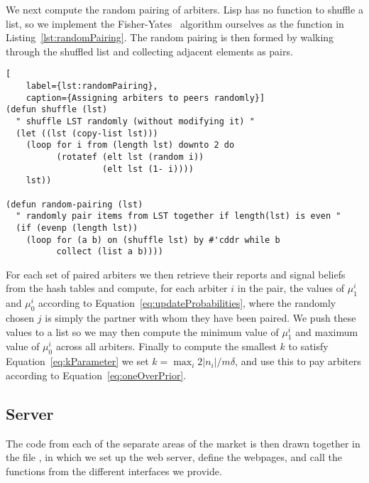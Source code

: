 We next compute the random pairing of arbiters. Lisp has no function to shuffle
a list, so we implement the Fisher-Yates~\cite[pg.~26-27]{FisherYates1938}
algorithm ourselves as the  function in
Listing~\ref{lst:randomPairing}. The random pairing is then formed by walking
through the shuffled list and collecting adjacent elements as pairs.

\begin{lstlisting}[
	label={lst:randomPairing},
	caption={Assigning arbiters to peers randomly}]
(defun shuffle (lst)
  " shuffle LST randomly (without modifying it) "
  (let ((lst (copy-list lst)))
    (loop for i from (length lst) downto 2 do
          (rotatef (elt lst (random i))
                   (elt lst (1- i))))
    lst))

(defun random-pairing (lst)
  " randomly pair items from LST together if length(lst) is even "
  (if (evenp (length lst))
    (loop for (a b) on (shuffle lst) by #'cddr while b
          collect (list a b))))
\end{lstlisting}

For each set of paired arbiters we then retrieve their reports and signal
beliefs from the hash tables and compute, for each arbiter $i$ in the pair, the
values of $\mu_1^i$ and $\mu_0^i$ according to
Equation~\ref{eq:updateProbabilities}, where the randomly chosen $j$ is simply
the partner with whom they have been paired. We push these values to a list so
we may then compute the minimum value of $\mu_1^i$ and maximum value of
$\mu_0^i$ across all arbiters. Finally to compute the smallest $k$ to satisfy
Equation~\ref{eq:kParameter} we set $k = \max_i 2|n_i|/m\delta$, and use this
to pay arbiters according to Equation~\ref{eq:oneOverPrior}.

\subsection{Server}

The code from each of the separate areas of the market is then drawn together
in the file , in which we set up the web server, define the
webpages, and call the functions from the different interfaces we provide.

